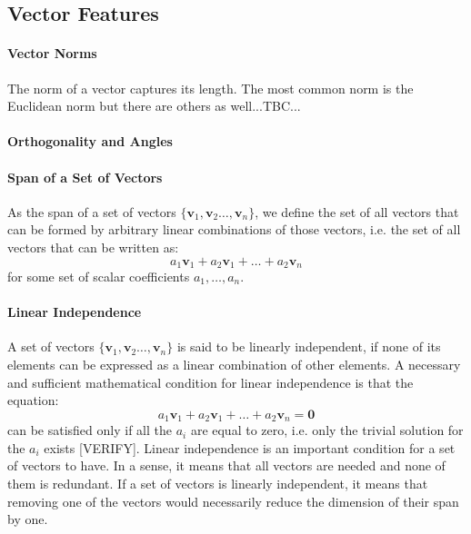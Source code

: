





\subsection{Vector Features}

\paragraph{Vector Norms}
The norm of a vector captures its length. The most common norm is the Euclidean norm but there are others as well...TBC...


\paragraph{Orthogonality and Angles}
% 


\paragraph{Span of a Set of Vectors}
As the span of a set of vectors $\{\mathbf{v}_1, \mathbf{v}_2 \ldots, \mathbf{v}_n \}$, we define the set of all vectors that can be formed by arbitrary linear combinations of those vectors, i.e. the set of all vectors that can be written as:
\begin{equation}
 a_1 \mathbf{v}_1 + a_2 \mathbf{v}_1  + \ldots + a_2 \mathbf{v}_n 
\end{equation}
for some set of scalar coefficients $a_1, \ldots, a_n$.


\paragraph{Linear Independence}
A set of vectors $\{\mathbf{v}_1, \mathbf{v}_2 \ldots, \mathbf{v}_n \}$ is said to be linearly independent, if none of its elements can be expressed as a linear combination of other elements. A necessary and sufficient mathematical condition for linear independence is that the equation:
\begin{equation}
 a_1 \mathbf{v}_1 + a_2 \mathbf{v}_1  + \ldots + a_2 \mathbf{v}_n = \mathbf{0}
\end{equation}
can be satisfied only if all the $a_i$ are equal to zero, i.e. only the trivial solution for the $a_i$ exists [VERIFY]. Linear independence is an important condition for a set of vectors to have. In a sense, it means that all vectors are needed and none of them is redundant. If a set of vectors is linearly independent, it means that removing one of the vectors would necessarily reduce the dimension of their span by one.

